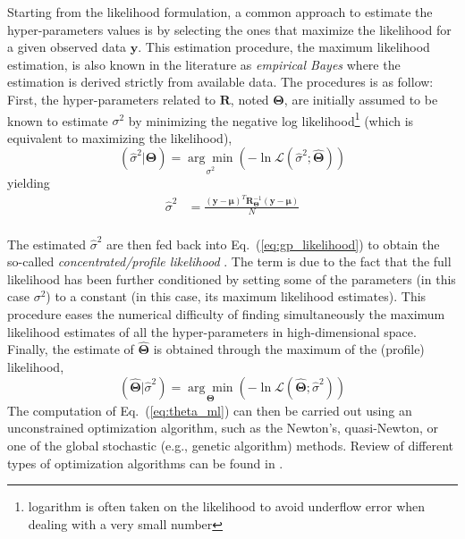 Starting from the likelihood formulation, a common approach to estimate the hyper-parameters values is by selecting the ones that maximize the likelihood for a given observed data $\mathbf{y}$.
This estimation procedure, the maximum likelihood estimation, is also known in the literature as \emph{empirical Bayes} \cite{Koehler1996} where the estimation is derived strictly from available data.
The procedures is as follow:
First, the hyper-parameters related to $\mathbf{R}$, noted $\boldsymbol{\Theta}$, are initially assumed to be known to estimate $\sigma^2$ by minimizing the negative log likelihood\footnote{logarithm is often taken on the likelihood to avoid underflow error when dealing with a very small number} (which is equivalent to maximizing the likelihood),
\begin{equation}
	\left(\hat{\sigma}^2 | \boldsymbol{\Theta}\right) = \underset{\sigma^2}{\arg\min} \left(- \ln \mathcal{L} (\hat{\sigma}^2 ; \hat{\boldsymbol{\Theta}})\right)
\label{eq:concentrated_likelihood_1}
\end{equation} 
yielding
\begin{equation}
	\begin{split}
		\hat{\sigma}^2           & = \frac{(\mathbf{y} - \boldsymbol{\mu})^T \mathbf{R}_{\boldsymbol{\Theta}}^{-1} (\mathbf{y} - \boldsymbol{\mu})}{N}\\
	\end{split}
\label{eq:sigma_ml}
\end{equation}

The estimated $\hat{\sigma}^2$ are then fed back into Eq.~(\ref{eq:gp_likelihood}) to obtain the so-called \emph{concentrated/profile likelihood} \cite{Cole2013,Kreutz2013}.
The term is due to the fact that the full likelihood has been further conditioned by setting some of the parameters 
(in this case $\sigma^2$) to a constant (in this case, its maximum likelihood estimates).
This procedure eases the numerical difficulty of finding simultaneously the maximum likelihood estimates of all the hyper-parameters in high-dimensional space.
Finally, the estimate of $\hat{\boldsymbol{\Theta}}$ is obtained through the maximum of the (profile) likelihood,
\begin{equation}
	\left(\hat{\boldsymbol{\Theta}} | \hat{\sigma}^2\right) = \underset{\boldsymbol{\Theta}}{\arg\min} \left(- \ln \mathcal{L} (\hat{\boldsymbol{\Theta}};\hat{\sigma}^2)\right)
	\label{eq:theta_ml}
\end{equation}
The computation of Eq.~(\ref{eq:theta_ml}) can then be carried out using an unconstrained optimization algorithm, 
such as the Newton's, quasi-Newton, or one of the global stochastic (e.g., genetic algorithm) methods.
Review of different types of optimization algorithms can be found in \cite{Venter2010}.

